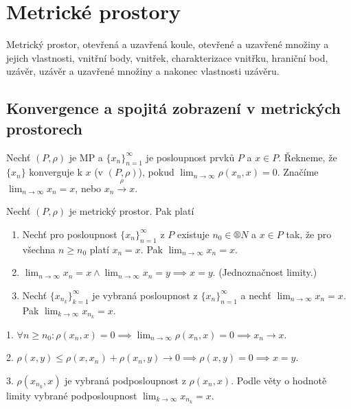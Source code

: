 \documentclass[12pt]{article}					%
\begin{document}


\section{Metrické prostory}

\begin{poznamka}[Opakovalo se:]
	Metrický prostor, otevřená a uzavřená koule, otevřené a uzavřené množiny a jejich vlastnosti, vnitřní body, vnitřek, charakterizace vnitřku, hraniční bod, uzávěr, uzávěr a uzavřené množiny a nakonec vlastnosti uzávěru.
\end{poznamka}

\subsection{Konvergence a spojitá zobrazení v metrických prostorech}
	\begin{definice}[Konvergence v MP]
		Nechť $(P, \rho)$ je MP a $\{x_n\}_{n=1}^∞$ je posloupnost prvků $P$ a $x \in P$. Řekneme, že $\{x_n\}$ konverguje k $x$ (v $(P, \rho)$), pokud $\lim_{n \rightarrow ∞} \rho(x_n, x) = 0$. Značíme $\lim_{n \rightarrow ∞} x_n = x$, nebo $x_n \overset{\rho}{\rightarrow} x$.
	\end{definice}

	\begin{veta}
		Nechť $(P, \rho)$ je metrický prostor. Pak platí
		
		\begin{enumerate}
			\item Nechť pro posloupnost $\{x_n\}_{n=1}^∞$ z $P$ existuje $n_0 \in ®N$ a $x \in P$ tak, že pro všechna $n ≥ n_0$ platí $x_n = x$. Pak $\lim_{n \rightarrow ∞} x_n = x$.
			\item $\lim_{n \rightarrow ∞} x_n = x \land \lim_{n \rightarrow ∞} x_n = y \implies x = y$. (Jednoznačnost limity.)
			\item Nechť $\{x_{n_k}\}_{k=1}^∞$ je vybraná posloupnost z $\{x_n\}_{n=1}^∞$ a nechť $\lim_{n \rightarrow ∞} x_n = x$. Pak $\lim_{k \rightarrow ∞} x_{n_k} = x$.
		\end{enumerate}

		\begin{dukazin}
			1. $\forall n ≥ n_0: \rho(x_n, x) = 0 \implies \lim_{n \rightarrow ∞} \rho(x_n, x) = 0 \implies x_n \rightarrow x$.

			2. $\rho(x, y) ≤ \rho(x, x_n) + \rho(x_n, y) \rightarrow 0 \implies \rho(x, y) = 0 \implies x = y$.

			3. $\rho(x_{n_k}, x)$ je vybraná podposloupnost z $\rho(x_n, x)$. Podle věty o hodnotě limity vybrané podposloupnost $\lim_{k \rightarrow ∞} x_{n_k} = x$.
		\end{dukazin}
	\end{veta}
\end{document}
